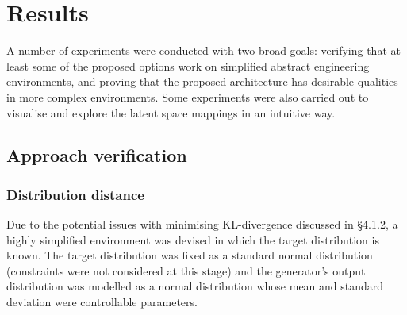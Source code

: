 \documentclass[../../main.tex]{subfiles}
\begin{document}
\chapter{Results}

A number of experiments were conducted with two broad goals: verifying that at least some of the proposed options work on simplified abstract engineering environments, and proving that the proposed architecture has desirable qualities in more complex environments.
Some experiments were also carried out to visualise and explore the latent space mappings in an intuitive way.

\section{Approach verification}

\subsection{Distribution distance}

Due to the potential issues with minimising KL-divergence discussed in \S 4.1.2, a highly simplified environment was devised in which the target distribution is known.
The target distribution was fixed as a standard normal distribution (constraints were not considered at this stage) and the generator's output distribution was modelled as a normal distribution whose mean and standard deviation were controllable parameters.
\end{document}
